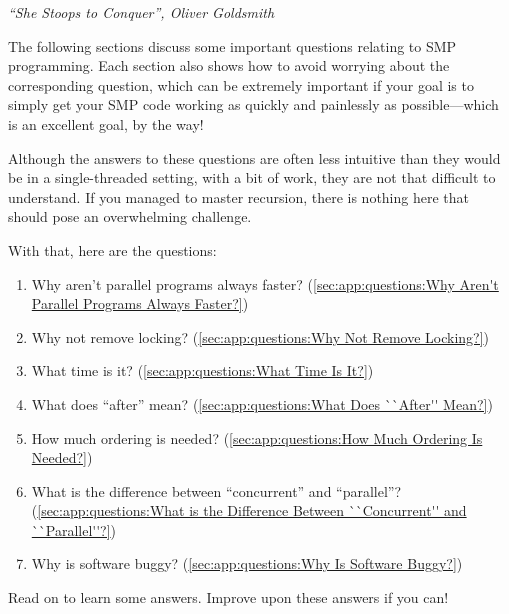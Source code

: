
%
	 {\emph{``She Stoops to Conquer'', Oliver Goldsmith}}

The following sections discuss some important questions relating to
SMP programming.
Each section also shows how to avoid worrying about
the corresponding question, which can be extremely important if
your goal is to simply get your SMP code working as quickly and
painlessly as possible---which is an excellent goal, by the way!

Although the answers to these questions are often less
intuitive than they would be in a single-threaded setting,
with a bit of work, they are not that difficult to understand.
If you managed to master recursion, there is nothing here that should
pose an overwhelming challenge.

With that, here are the questions:

\begin{enumerate}
\item	Why aren't parallel programs always faster?
	(\cref{sec:app:questions:Why Aren't Parallel Programs Always Faster?})
\item	Why not remove locking?
	(\cref{sec:app:questions:Why Not Remove Locking?})
\item	What time is it?
	(\cref{sec:app:questions:What Time Is It?})
\item	What does ``after'' mean?
	(\cref{sec:app:questions:What Does ``After'' Mean?})
\item	How much ordering is needed?
	(\cref{sec:app:questions:How Much Ordering Is Needed?})
\item	What is the difference between ``concurrent'' and ``parallel''?
	(\cref{sec:app:questions:What is the Difference Between ``Concurrent'' and ``Parallel''?})
\item	Why is software buggy?
	(\cref{sec:app:questions:Why Is Software Buggy?})
\end{enumerate}

Read on to learn some answers.
Improve upon these answers if you can!









